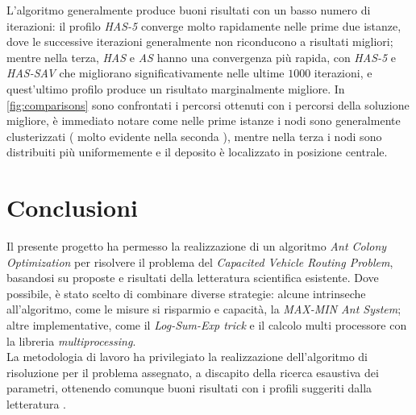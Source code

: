 \documentclass[11pt,a4paper]{article}
\begin{document}
L'algoritmo generalmente produce buoni risultati con un basso numero di iterazioni: il profilo \textit{HAS-5} converge molto rapidamente nelle prime due istanze, dove le successive iterazioni generalmente non riconducono a risultati migliori; mentre nella terza, \textit{HAS} e \textit{AS} hanno una convergenza più rapida, con \textit{HAS-5} e \textit{HAS-SAV} che migliorano significativamente nelle ultime \(1000\) iterazioni, e quest'ultimo profilo produce un risultato marginalmente migliore. In \autoref{fig:comparisons}  sono confrontati i percorsi ottenuti con i percorsi della soluzione migliore, è immediato notare come nelle prime istanze i nodi sono generalmente clusterizzati ( molto evidente nella seconda ), mentre nella terza i nodi sono distribuiti più uniformemente e il deposito è localizzato in posizione centrale.

\section{Conclusioni}
Il presente progetto ha permesso la realizzazione di un algoritmo \textit{Ant Colony Optimization} per risolvere il problema del \textit{Capacited Vehicle Routing Problem}, basandosi su proposte e risultati della letteratura scientifica esistente. Dove possibile, è stato scelto di combinare diverse strategie: alcune intrinseche all'algoritmo, come le misure si risparmio e capacità, la \textit{MAX-MIN Ant System}; altre implementative, come il \textit{Log-Sum-Exp trick} e il calcolo multi processore con la libreria \textit{multiprocessing}.
\\La metodologia di lavoro ha privilegiato la realizzazione dell'algoritmo di risoluzione per il problema assegnato, a discapito della ricerca esaustiva dei parametri, ottenendo comunque buoni risultati con i profili suggeriti dalla letteratura \cite{Bullnheimer}.
\end{document}
